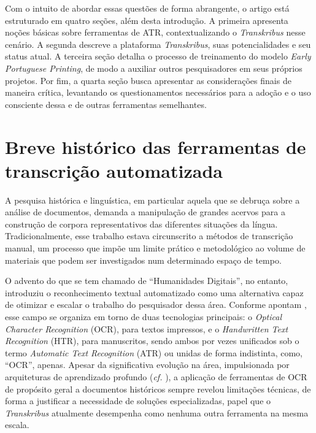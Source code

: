 \documentclass[portuguese]{textolivre}
\begin{document}
Com o intuito de abordar essas questões de forma abrangente, o artigo está estruturado em quatro seções, além desta introdução. A primeira apresenta noções básicas sobre ferramentas de ATR, contextualizando o \textit{Transkribus }nesse cenário. A segunda descreve a plataforma \textit{Transkribus}, suas potencialidades e seu status atual. A terceira seção detalha o processo de treinamento do modelo \textit{Early Portuguese Printing}, de modo a auxiliar outros pesquisadores em seus próprios projetos. Por fim, a quarta seção busca apresentar as considerações finais de maneira crítica, levantando os questionamentos necessários para a adoção e o uso consciente dessa e de outras ferramentas semelhantes.

\section{Breve histórico das ferramentas de transcrição automatizada}
A pesquisa histórica e linguística, em particular aquela que se debruça sobre a análise de documentos, demanda a manipulação de grandes acervos para a construção de corpora representativos das diferentes situações da língua. Tradicionalmente, esse trabalho estava circunscrito a métodos de transcrição manual, um processo que impõe um limite prático e metodológico ao volume de materiais que podem ser investigados num determinado espaço de tempo.

O advento do que se tem chamado de “Humanidades Digitais”, no entanto, introduziu o reconhecimento textual automatizado como uma alternativa capaz de otimizar e escalar o trabalho do pesquisador dessa área. Conforme apontam \textcite{baudry2023humanidades}, esse campo se organiza em torno de duas tecnologias principais: o \textit{Optical Character Recognition }(OCR), para textos impressos, e o\textit{ Handwritten Text Recognition }(HTR), para manuscritos, sendo ambos por vezes unificados sob o termo \textit{Automatic Text Recognition }(ATR) ou unidas de forma indistinta, como, “OCR”, apenas. Apesar da significativa evolução na área, impulsionada por arquiteturas de aprendizado profundo (\textit{cf.} \textcite{alkendi2024advancements}), a aplicação de ferramentas de OCR de propósito geral a documentos históricos sempre revelou limitações técnicas, de forma a justificar a necessidade de soluções especializadas, papel que o \textit{Transkribus} atualmente desempenha como nenhuma outra ferramenta na mesma escala.
\end{document}
